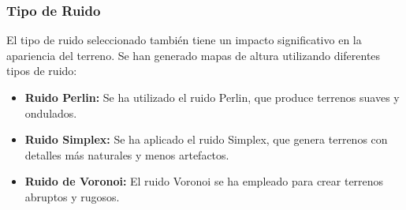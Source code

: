 \subsubsection{Tipo de Ruido}

El tipo de ruido seleccionado también tiene un impacto significativo en la apariencia del terreno. Se han generado mapas de altura utilizando diferentes tipos de ruido:

\begin{itemize}
    \item \textbf{Ruido Perlin:} Se ha utilizado el ruido Perlin, que produce terrenos suaves y ondulados.
    \item \textbf{Ruido Simplex:} Se ha aplicado el ruido Simplex, que genera terrenos con detalles más naturales y menos artefactos.
    \item \textbf{Ruido de Voronoi:} El ruido Voronoi se ha empleado para crear terrenos abruptos y rugosos.
\end{itemize}

